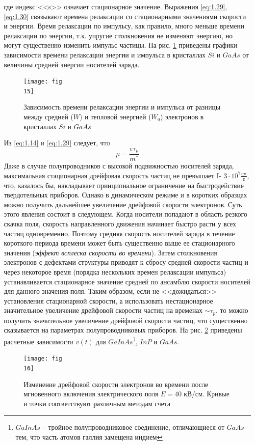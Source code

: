 где индекс <<s>> означает стационарное значение. Выражения \eqref{eq:1.29}, \eqref{eq:1.30}
связывают времена релаксации со стационарными значениями скорости и энергии.
Время релаксации по импульсу, как правило, много меньше времени релаксации
по энергии, т.к. упругие столкновения не изменяют энергию, но могут существенно изменить импульс частицы. На рис. \ref{fig:5} приведены графики зависимости
времени релаксации энергии и импульса в кристаллах $Si$ и $GaAs$ от величины
средней энергии носителей заряда.
\begin{figure}[h!]
	\centering
	\texttt{[image: fig\\15]}
	\caption{Зависимость времени релаксации энергии и импульса от разницы между средней 
	($W$) и тепловой энергией ($W_0$) электронов в кристаллах $Si$ и $GaAs$}
	\label{fig:5}
\end{figure}
Из \eqref{eq:1.14} и \eqref{eq:1.29} следует, что 
\begin{equation}
\label{eq:1.31}
	\mu =\frac{e \tau_p}{m^*}
\end{equation}
Даже в случае полупроводников с высокой подвижностью носителей заряда,
максимальная стационарная дрейфовая скорость частиц не превышает I-
$3\cdot 10^7\frac{\text{см}}{\text{с}}$, что, казалось бы, накладывает принципиальное ограничение на быстродействие твердотельных приборов. Однако в динамическом режиме и в коротких образцах можно получить дальнейшее увеличение дрейфовой скорости электронов. Суть этого явления состоит в следующем. Когда носители попадают в
область резкого скачка поля, скорость направленного движения начинает быстро
расти у всех частиц одновременно. Поэтому средняя скорость носителей заряда в
течение короткого периода времени может быть существенно выше ее стационарного значения (\textit{эффект всплеска скорости во времени}). Затем столкновения электронов с дефектами структуры приводят к сбросу средней скорости частиц и через некоторое время (порядка нескольких времен релаксации импульса) устанавливается стационарное значение средней по ансамблю скорости носителей для данного значения поля. Таким образом, если не <<дожидаться>>
установления стационарной скорости, а использовать нестационарное значительное увеличение дрейфовой скорости частиц на временах $\sim \tau_p$, то можно получить значительное увеличение дрейфовой скорости частиц, что существенно сказывается на параметрах полупроводниковых приборов. На рис. \ref{fig:6} приведены расчетные зависимости $v(t)$ для 
$GaInAs$\footnote{$GaInAs$ -- тройное полупроводниковое соединение, отличающиеся от $GaAs$ тем, что часть атомов галлия замещена индием}, $InP$  и $GaAs$.
\begin{figure}[h!]
	\centering
	\texttt{[image: fig\\16]}
	\caption{Изменение дрейфовой скорости электронов во времени после мгновенного включения электрического поля $E=40$ кВ/см. Кривые и точки соответствуют различным методам счета \cite{lit6}}
	\label{fig:6}
\end{figure}

